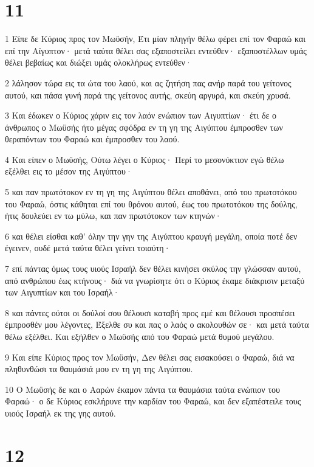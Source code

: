 \chapter{11}

\par 1 Είπε δε Κύριος προς τον Μωϋσήν, Έτι μίαν πληγήν θέλω φέρει επί τον Φαραώ και επί την Αίγυπτον· μετά ταύτα θέλει σας εξαποστείλει εντεύθεν· εξαποστέλλων υμάς θέλει βεβαίως και διώξει υμάς ολοκλήρως εντεύθεν·
\par 2 λάλησον τώρα εις τα ώτα του λαού, και ας ζητήση πας ανήρ παρά του γείτονος αυτού, και πάσα γυνή παρά της γείτονος αυτής, σκεύη αργυρά, και σκεύη χρυσά.
\par 3 Και έδωκεν ο Κύριος χάριν εις τον λαόν ενώπιον των Αιγυπτίων· έτι δε ο άνθρωπος ο Μωϋσής ήτο μέγας σφόδρα εν τη γη της Αιγύπτου έμπροσθεν των θεραπόντων του Φαραώ και έμπροσθεν του λαού.
\par 4 Και είπεν ο Μωϋσής, Ούτω λέγει ο Κύριος· Περί το μεσονύκτιον εγώ θέλω εξέλθει εις το μέσον της Αιγύπτου·
\par 5 και παν πρωτότοκον εν τη γη της Αιγύπτου θέλει αποθάνει, από του πρωτοτόκου του Φαραώ, όστις κάθηται επί του θρόνου αυτού, έως του πρωτοτόκου της δούλης, ήτις δουλεύει εν τω μύλω, και παν πρωτότοκον των κτηνών·
\par 6 και θέλει είσθαι καθ' όλην την γην της Αιγύπτου κραυγή μεγάλη, οποία ποτέ δεν έγεινεν, ουδέ μετά ταύτα θέλει γείνει τοιαύτη·
\par 7 επί πάντας όμως τους υιούς Ισραήλ δεν θέλει κινήσει σκύλος την γλώσσαν αυτού, από ανθρώπου έως κτήνους· διά να γνωρίσητε ότι ο Κύριος έκαμε διάκρισιν μεταξύ των Αιγυπτίων και του Ισραήλ·
\par 8 και πάντες ούτοι οι δούλοί σου θέλουσι καταβή προς εμέ και θέλουσι προσπέσει έμπροσθέν μου λέγοντες, Έξελθε συ και πας ο λαός ο ακολουθών σε· και μετά ταύτα θέλω εξέλθει. Και εξήλθεν ο Μωϋσής από του Φαραώ μετά θυμού μεγάλου.
\par 9 Και είπε Κύριος προς τον Μωϋσήν, Δεν θέλει σας εισακούσει ο Φαραώ, διά να πληθυνθώσι τα θαυμάσιά μου εν τη γη της Αιγύπτου.
\par 10 Ο Μωϋσής δε και ο Ααρών έκαμον πάντα τα θαυμάσια ταύτα ενώπιον του Φαραώ· ο δε Κύριος εσκλήρυνε την καρδίαν του Φαραώ, και δεν εξαπέστειλε τους υιούς Ισραήλ εκ της γης αυτού.

\chapter{12}

